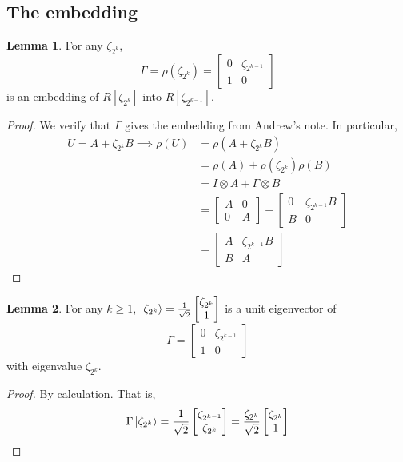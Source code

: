 \documentclass{article}
\theoremstyle{definition}
\theoremstyle{theorem}
\newtheorem{lemma}{Lemma}
\theoremstyle{remark}
\begin{document}
\subsection{The embedding}

\begin{lemma}
For any $\zeta_{2^k}$, 
\[
	\Gamma = \rho(\zeta_{2^k}) = \begin{bmatrix} 0 & \zeta_{2^{k-1}} \\ 1 & 0 \end{bmatrix}
\]
is an embedding of $R[\zeta_{2^k}]$ into $R[\zeta_{2^{k-1}}]$.
\end{lemma}
\begin{proof}
We verify that $\Gamma$ gives the embedding from Andrew's note. In particular,
\begin{align*}
	U = A + \zeta_{2^k}B \implies \rho(U) &= \rho(A + \zeta_{2^k}B) \\
		&=\rho(A) + \rho(\zeta_{2^k})\rho(B) \\
		&=I \otimes A + \Gamma \otimes B \\
		&=\begin{bmatrix} A & 0 \\ 0 & A \end{bmatrix} + \begin{bmatrix} 0 & \zeta_{2^{k-1}}B \\ B & 0 \end{bmatrix} \\
		&= \begin{bmatrix} A & \zeta_{2^{k-1}}B \\ B & A \end{bmatrix}
\end{align*}
\end{proof}

\begin{lemma}
For any $k\geq 1$, $\ket{\zeta_{2^k}} = \frac{1}{\sqrt{2}}\begin{bmatrix} \zeta_{2^k} \\ 1 \end{bmatrix}$ is a unit eigenvector of
\[
	\Gamma = \begin{bmatrix} 0 & \zeta_{2^{k-1}} \\ 1 & 0 \end{bmatrix}
\]
with eigenvalue $\zeta_{2^k}$.
\end{lemma}
\begin{proof}
By calculation. That is,
\[
	\Gamma \ket{\zeta_{2^k}} = \frac{1}{\sqrt{2}}\begin{bmatrix} \zeta_{2^{k-1}} \\ \zeta_{2^k} \end{bmatrix} 
		= \frac{\zeta_{2^k}}{\sqrt{2}} \begin{bmatrix} \zeta_{2^k} \\ 1 \end{bmatrix}
\]
\end{proof}
\end{document}
